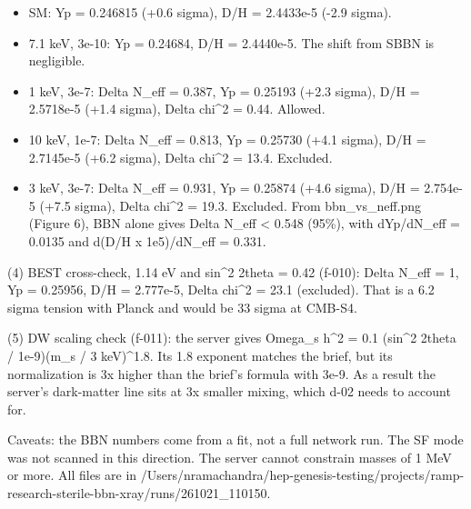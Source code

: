\documentclass[11pt,a4paper]{article}
\begin{document}
\begin{itemize}
  \item SM: Yp = 0.246815 (+0.6 sigma), D/H = 2.4433e-5 (-2.9 sigma).
  \item 7.1 keV, 3e-10: Yp = 0.24684, D/H = 2.4440e-5. The shift from SBBN is negligible.
  \item 1 keV, 3e-7: Delta N\_eff = 0.387, Yp = 0.25193 (+2.3 sigma), D/H = 2.5718e-5 (+1.4 sigma), Delta chi\textasciicircum{}2 = 0.44. Allowed.
  \item 10 keV, 1e-7: Delta N\_eff = 0.813, Yp = 0.25730 (+4.1 sigma), D/H = 2.7145e-5 (+6.2 sigma), Delta chi\textasciicircum{}2 = 13.4. Excluded.
  \item 3 keV, 3e-7: Delta N\_eff = 0.931, Yp = 0.25874 (+4.6 sigma), D/H = 2.754e-5 (+7.5 sigma), Delta chi\textasciicircum{}2 = 19.3. Excluded.
From bbn\_vs\_neff.png (Figure 6), BBN alone gives Delta N\_eff \textless{} 0.548 (95\%), with dYp/dN\_eff = 0.0135 and d(D/H x 1e5)/dN\_eff = 0.331.

\end{itemize}
(4) BEST cross-check, 1.14 eV and sin\textasciicircum{}2 2theta = 0.42 (f-010): Delta N\_eff = 1, Yp = 0.25956, D/H = 2.777e-5, Delta chi\textasciicircum{}2 = 23.1 (excluded). That is a 6.2 sigma tension with Planck and would be 33 sigma at CMB-S4.

(5) DW scaling check (f-011): the server gives Omega\_s h\textasciicircum{}2 = 0.1 (sin\textasciicircum{}2 2theta / 1e-9)(m\_s / 3 keV)\textasciicircum{}1.8. Its 1.8 exponent matches the brief, but its normalization is 3x higher than the brief's formula with 3e-9. As a result the server's dark-matter line sits at 3x smaller mixing, which d-02 needs to account for.

Caveats: the BBN numbers come from a fit, not a full network run. The SF mode was not scanned in this direction. The server cannot constrain masses of 1 MeV or more. All files are in /Users/nramachandra/hep-genesis-testing/projects/ramp-research-sterile-bbn-xray/runs/261021\_110150.
\end{document}
